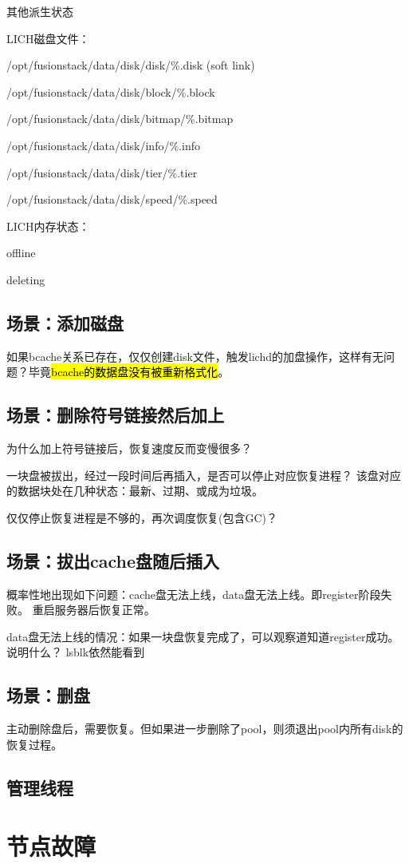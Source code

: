 其他派生状态

LICH磁盘文件：
\begin{enumbox}
\item /opt/fusionstack/data/disk/disk/\%.disk (soft link)
\item /opt/fusionstack/data/disk/block/\%.block
\item /opt/fusionstack/data/disk/bitmap/\%.bitmap
\item /opt/fusionstack/data/disk/info/\%.info
\item /opt/fusionstack/data/disk/tier/\%.tier
\item /opt/fusionstack/data/disk/speed/\%.speed
\end{enumbox}

LICH内存状态：
\begin{enumbox}
\item offline
\item deleting
\end{enumbox}

\subsection{场景：添加磁盘}

如果bcache关系已存在，仅仅创建disk文件，触发lichd的加盘操作，这样有无问题？毕竟\hl{bcache的数据盘没有被重新格式化}。

\subsection{场景：删除符号链接然后加上}

为什么加上符号链接后，恢复速度反而变慢很多？

一块盘被拔出，经过一段时间后再插入，是否可以停止对应恢复进程？
该盘对应的数据块处在几种状态：最新、过期、或成为垃圾。

仅仅停止恢复进程是不够的，再次调度恢复(包含GC)？

\subsection{场景：拔出cache盘随后插入}

概率性地出现如下问题：cache盘无法上线，data盘无法上线。即register阶段失败。
重启服务器后恢复正常。

data盘无法上线的情况：如果一块盘恢复完成了，可以观察道知道register成功。说明什么？
lsblk依然能看到

\subsection{场景：删盘}

主动删除盘后，需要恢复。但如果进一步删除了pool，则须退出pool内所有disk的恢复过程。

\subsection{管理线程}

\section{节点故障}
